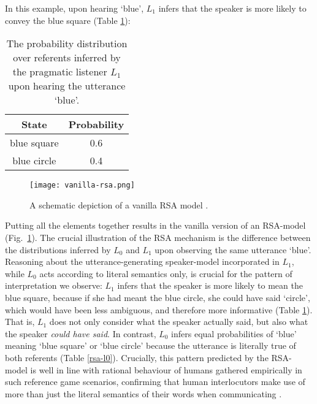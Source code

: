 In this example, upon hearing `blue', $L_1$ infers that the speaker is more likely to convey the blue square (Table \ref{rsa-l1}):

\begin{table}[h]
	\begin{center}
		\caption{The probability distribution over referents inferred by the pragmatic listener $L_1$ upon hearing the utterance `blue'.}
		\label{rsa-l1}
		\vskip 0.12in
		\begin{tabular}{cc}
			State & Probability \\
			\hline
			blue square & 0.6 \\
			blue circle & 0.4
		\end{tabular}
	\end{center}
\end{table}
\begin{figure*}[t]
	\begin{center}
		\texttt{[image: vanilla-rsa.png]}
	\end{center}
	\vspace{-0.3cm}
	\caption{A schematic depiction of a vanilla RSA model \parencite{problang}.}
	\label{vanilla-rsa}
\end{figure*}
Putting all the elements together results in the vanilla version of an RSA-model (Fig.~\ref{vanilla-rsa}).
The crucial illustration of the RSA mechanism is the difference between the distributions inferred by $L_0$ and $L_1$ upon observing the same utterance `blue'. Reasoning about the utterance-generating speaker-model incorporated in $L_1$, while $L_0$ acts according to literal semantics only, is crucial for the pattern of interpretation we observe: $L_1$ infers that the speaker is more likely to mean the blue square, because if she had meant the blue circle, she could have said `circle', which would have been less ambiguous, and therefore more informative (Table \ref{rsa-l1}). That is, $L_1$ does not only consider what the speaker actually said, but also what the speaker \emph{could have said}. In contrast, $L_0$ infers equal probabilities of `blue' meaning `blue square' or `blue circle' because the utterance is literally true of both referents (Table \ref{rsa-l0}). Crucially, this pattern predicted by the RSA-model is well in line with rational behaviour of humans gathered empirically in such reference game scenarios, confirming that human interlocutors make use of more than just the literal semantics of their words when communicating \parencite{frank2012predicting, problang}.

